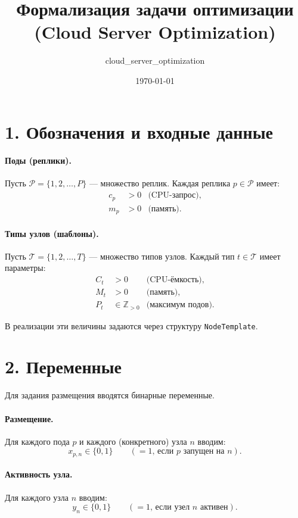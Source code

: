 \documentclass[11pt]{article}
\title{Формализация задачи оптимизации\\(Cloud Server Optimization)}
\author{cloud\_server\_optimization}
\date{\today}
\begin{document}
\maketitle

\section*{1. Обозначения и входные данные}

\paragraph{Поды (реплики).} Пусть
\(\mathcal{P}=\{1,2,\dots,P\}\) --- множество реплик.
Каждая реплика \(p\in\mathcal{P}\) имеет:
\begin{align*}
  c_p &>0 &\text{(CPU-запрос)},\\
  m_p &>0 &\text{(память)}.
\end{align*}

\paragraph{Типы узлов (шаблоны).} Пусть
\(\mathcal{T}=\{1,2,\dots,T\}\) --- множество типов узлов.
Каждый тип \(t\in\mathcal{T}\) имеет параметры:
\begin{align*}
  C_t &>0 &\text{(CPU-ёмкость)},\\
  M_t &>0 &\text{(память)},\\
  P_t &\in\mathbb{Z}_{>0} &\text{(максимум подов)}.
\end{align*}

В реализации эти величины задаются через структуру \texttt{NodeTemplate}.

\section*{2. Переменные}

Для задания размещения вводятся бинарные переменные.

\paragraph{Размещение.} Для каждого пода \(p\) и каждого (конкретного) узла \(n\) вводим:
\[ x_{p,n}\in\{0,1\} \qquad(=1\text{, если }p\text{ запущен на }n). \]

\paragraph{Активность узла.} Для каждого узла \(n\) вводим:
\[ y_n\in\{0,1\} \qquad(=1\text{, если узел }n\text{ активен}). \]
\end{document}
